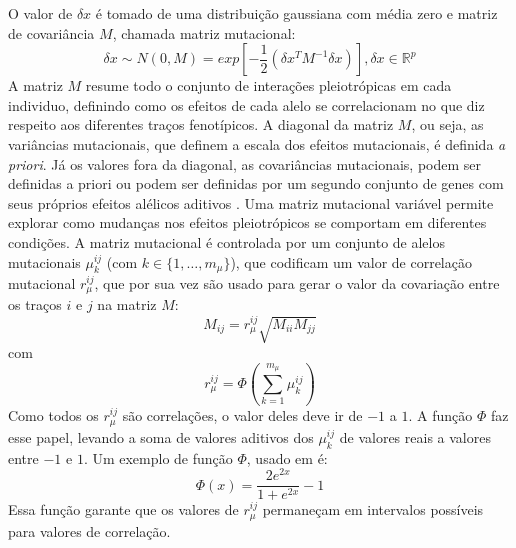 \documentclass[a4paper, 12pt, titlepage, onecolumn]{article}
\numberwithin{equation}{section}
\numberwithin{table}{section}
\begin{document}
O valor de $\delta x$ é tomado de uma distribuição gaussiana com média
zero e matriz de covariância $M$, chamada matriz mutacional:
\begin{equation}
\delta x \sim N(0, M) = exp \left[-\frac{1}{2} (\delta x^T M^{-1} \delta x)\right] , \delta x \in \mathbb{R}^p
\end{equation}
A matriz $M$ resume todo o conjunto de interações pleiotrópicas em cada
individuo, definindo como os efeitos de cada alelo se correlacionam no
que diz respeito aos diferentes traços fenotípicos.  A diagonal da
matriz $M$, ou seja, as variâncias mutacionais, que definem a escala dos
efeitos mutacionais, é definida {\it a priori}. Já os valores fora da
diagonal, as covariâncias mutacionais, podem ser definidas a priori
\citep{Jones2003, Jones2004} ou podem ser definidas por um segundo
conjunto de genes com seus próprios efeitos alélicos aditivos
\citep{Jones2007}. Uma matriz mutacional variável permite explorar como
mudanças nos efeitos pleiotrópicos se comportam em diferentes condições.
A matriz mutacional é controlada por um conjunto de alelos mutacionais
$\mu^{ij}_k$ (com $k \in \{1,\ldots,m_\mu\}$), que codificam um valor de
correlação mutacional $r_\mu^{ij}$, que por sua vez são usado para gerar
o valor da covariação entre os traços $i$ e $j$ na matriz $M$:
\begin{equation}
M_{ij} = r_\mu^{ij} \sqrt {M_{ii}M_{jj}}
\end{equation}
com
\begin{equation}
r_\mu^{ij} = \Phi \left(\sum_{k=1}^{m_\mu} \mu^{ij}_k\right)
\end{equation}
Como todos os $r_\mu^{ij}$ são correlações, o valor deles deve ir de
$-1$ a $1$. A função $\Phi$ faz esse papel, levando a soma de valores
aditivos dos $\mu^{ij}_k$ de valores reais a valores entre $-1$ e $1$.
Um exemplo de função $\Phi$, usado em \cite{Jones2007} é:
\begin{equation}
\Phi (x) = \frac{2e^{2x}}{1+e^{2x}} - 1
\end{equation}
Essa função garante que os valores de $r_\mu^{ij}$ permaneçam em
intervalos possíveis para valores de correlação.
\end{document}
